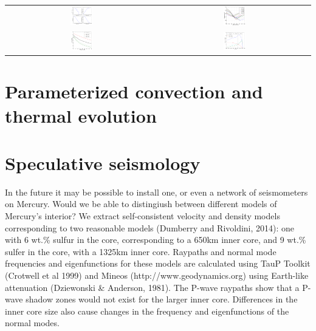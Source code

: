 \documentclass[landscape,a0b,final]{a0poster}
\begin{document}
\begin{multicols}{3}
\begin{center}
\begin{tabular}{cc}
 \includegraphics[width=0.15\textwidth]{profiles.png} &
 \includegraphics[width=0.15\textwidth]{Liquidus_model.png} \\
 \includegraphics[width=0.15\textwidth]{clapeyron_1.png} &
 \includegraphics[width=0.15\textwidth]{core_energetics.png} \\
\end{tabular}
\label{interior_model}
\end{center}

\columnbreak

\section*{Parameterized convection and thermal evolution}



\section*{Speculative seismology}

In the future it may be possible to install one, or even a network of seismometers on Mercury. Would we be able to distingiush between different models of Mercury's interior? We extract self-consistent velocity and density models corresponding to two reasonable models (Dumberry and Rivoldini, 2014): one with 6 wt.\% sulfur in the core, corresponding to a 650km inner core, and 9 wt.\% sulfer in the core, with a 1325km inner core.
Raypaths and normal mode frequencies and eigenfunctions for these models are calculated using TauP Toolkit (Crotwell et al 1999) and Mineos (http://www.geodynamics.org) using Earth-like attenuation (Dziewonski \&  Anderson, 1981). The P-wave raypaths show that a P-wave shadow zones would not exist for the larger inner core. Differences in the inner core size also cause changes in the frequency and eigenfunctions of the normal modes. 


\end{multicols}
\end{document}
